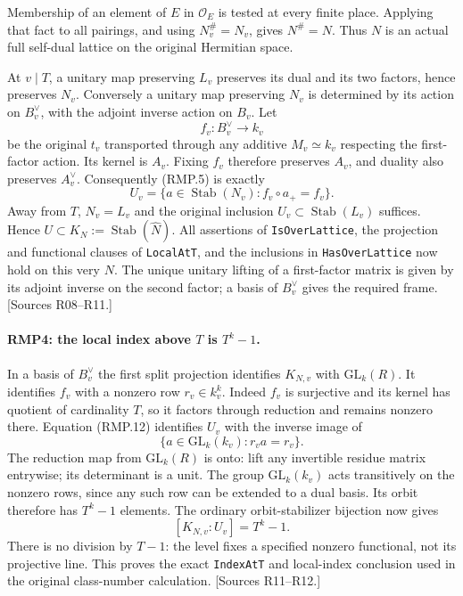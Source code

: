 Membership of an element of $E$ in $\mathcal O_E$ is tested at every
finite place. Applying that fact to all pairings, and using
$N_v^{\#}=N_v$, gives $N^{\#}=N$. Thus $N$ is an actual full
self-dual lattice on the original Hermitian space.

At $v\mid T$, a unitary map preserving $L_v$ preserves its dual
and its two factors, hence preserves $N_v$. Conversely a unitary
map preserving $N_v$ is determined by its action on $B_v^{\vee}$,
with the adjoint inverse action on $B_v$. Let
\[
 f_v:B_v^{\vee}\longrightarrow k_v
                                                               \tag{RMP.11}
\]
be the original $t_v$ transported through any additive
$M_v\simeq k_v$ respecting the first-factor action. Its kernel is
$A_v$. Fixing $f_v$ therefore preserves $A_v$, and duality also
preserves $A_v^{\vee}$. Consequently (RMP.5) is exactly
\[
 U_v=\{a\in\operatorname{Stab}(N_v):f_v\circ a_+=f_v\}.
                                                               \tag{RMP.12}
\]
Away from $T$, $N_v=L_v$ and the original inclusion
$U_v\subset\operatorname{Stab}(L_v)$ suffices. Hence
$U\subset K_N:=\operatorname{Stab}(\widehat N)$.
All assertions of \texttt{IsOverLattice}, the projection and
functional clauses of \texttt{LocalAtT}, and the inclusions in
\texttt{HasOverLattice} now hold on this very $N$.
The unique unitary lifting of a first-factor matrix is given by
its adjoint inverse on the second factor; a basis of
$B_v^{\vee}$ gives the required frame. [Sources R08--R11.]

\paragraph{RMP4: the local index above $T$ is $T^k-1$.}
\label{claim:RMP4}
In a basis of $B_v^{\vee}$ the first split projection identifies
$K_{N,v}$ with $\mathrm{GL}_k(R)$. It identifies $f_v$ with a
nonzero row $r_v\in k_v^k$. Indeed $f_v$ is surjective and its
kernel has quotient of cardinality $T$, so it factors through
reduction and remains nonzero there. Equation (RMP.12) identifies
$U_v$ with the inverse image of
\[
 \{a\in\mathrm{GL}_k(k_v):r_va=r_v\}.                \tag{RMP.13}
\]
The reduction map from $\mathrm{GL}_k(R)$ is onto: lift any
invertible residue matrix entrywise; its determinant is a unit.
The group $\mathrm{GL}_k(k_v)$ acts transitively on the nonzero
rows, since any such row can be extended to a dual basis. Its
orbit therefore has $T^k-1$ elements. The ordinary orbit-stabilizer
bijection now gives
\[
                       [K_{N,v}:U_v]=T^k-1.           \tag{RMP.14}
\]
There is no division by $T-1$: the level fixes a specified nonzero
functional, not its projective line. This proves the exact
\texttt{IndexAtT} and local-index conclusion used in the original
class-number calculation. [Sources R11--R12.]


